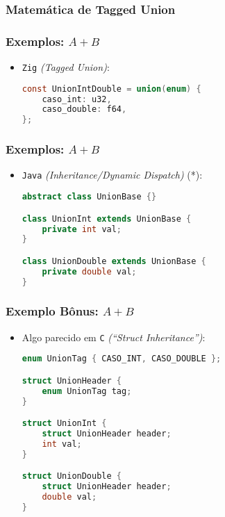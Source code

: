 \documentclass{beamer}
\newcommand{\lang}[1]{\texttt{#1}}
\begin{document}
\begin{frame}
    \frametitle{Matemática de Tagged Union}
\end{frame}

\begin{frame}[fragile]
    \frametitle{Exemplos: \(A + B\)}
    \begin{itemize}
        \item \lang{Zig} \emph{(Tagged Union)}:
            \begin{lstlisting}[language=C]
const UnionIntDouble = union(enum) {
    caso_int: u32,
    caso_double: f64,
};
            \end{lstlisting}
    \end{itemize}
\end{frame}

\begin{frame}[fragile]
    \frametitle{Exemplos: \(A + B\)}
    \begin{itemize}
        \item \lang{Java} \emph{(Inheritance/Dynamic Dispatch)} (*):
            \begin{lstlisting}[language=Java]
abstract class UnionBase {}

class UnionInt extends UnionBase {
    private int val;
}

class UnionDouble extends UnionBase {
    private double val;
}
            \end{lstlisting}
    \end{itemize}
\end{frame}

\begin{frame}[fragile]
    \frametitle{Exemplo Bônus: \(A + B\)}
    \begin{itemize}
        \item Algo parecido em \lang{C}
            \emph{(``Struct Inheritance'')}:
            \begin{lstlisting}[language=C]
enum UnionTag { CASO_INT, CASO_DOUBLE };

struct UnionHeader {
    enum UnionTag tag;
}

struct UnionInt {
    struct UnionHeader header;
    int val;
}

struct UnionDouble {
    struct UnionHeader header;
    double val;
}
            \end{lstlisting}
    \end{itemize}
\end{frame}
\end{document}
